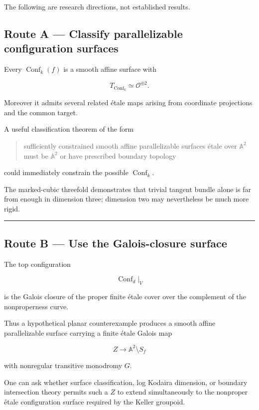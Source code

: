 The following are research directions, not established results.

\subsection{Route A --- Classify parallelizable configuration
surfaces}\label{route-a-classify-parallelizable-configuration-surfaces}

Every \(\operatorname{Conf}_k(f)\) is a smooth affine surface with

\[
T_{\operatorname{Conf}_k}\simeq\mathcal O^{\oplus2}.
\]

Moreover it admits several related étale maps arising from coordinate
projections and the common target.

A useful classification theorem of the form

\begin{quote}
sufficiently constrained smooth affine parallelizable surfaces étale
over \(\mathbb A^2\) must be \(\mathbb A^2\) or have prescribed boundary
topology
\end{quote}

could immediately constrain the possible \(\operatorname{Conf}_k\).

The marked-cubic threefold demonstrates that trivial tangent bundle
alone is far from enough in dimension three; dimension two may
nevertheless be much more rigid.

\begin{center}\rule{0.5\linewidth}{0.5pt}\end{center}

\subsection{Route B --- Use the Galois-closure
surface}\label{route-b-use-the-galois-closure-surface}

The top configuration

\[
\operatorname{Conf}_d|_V
\]

is the Galois closure of the proper finite étale cover over the
complement of the nonproperness curve.

Thus a hypothetical planar counterexample produces a smooth affine
parallelizable surface carrying a finite étale Galois map

\[
Z\to\mathbb A^2\setminus S_f
\]

with nonregular transitive monodromy \(G\).

One can ask whether surface classification, log Kodaira dimension, or
boundary intersection theory permits such a \(Z\) to extend
simultaneously to the nonproper étale configuration surface required by
the Keller groupoid.

